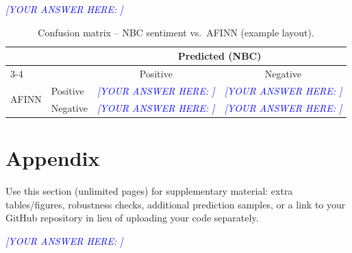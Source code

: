 \documentclass[11pt]{article}
\newcommand{\answer}[1]{%
  \textcolor{blue}{\emph{[YOUR ANSWER HERE: #1]}}
}
\begin{document}
\answer{}

\begin{table}[H]
  \centering
  \caption{Confusion matrix -- NBC sentiment vs.\ AFINN (example layout).}
  \label{tab:AFINN-confusion}
  \begin{tabular}{llcc}
    \toprule
    & & \multicolumn{2}{c}{Predicted (NBC)} \\
    \cmidrule(lr){3-4}
    & & Positive & Negative \\
    \midrule
    \multirow{2}{*}{AFINN} & Positive & \answer{} & \answer{} \\
                           & Negative & \answer{} & \answer{} \\
    \bottomrule
  \end{tabular}
\end{table}

\appendix
\section{Appendix}
Use this section (unlimited pages) for supplementary material: extra tables/figures,
robustness checks, additional prediction samples, or a link to your GitHub
repository in lieu of uploading your code separately.

\answer{}
\end{document}

